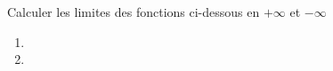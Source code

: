 \begin{exercice}
Calculer les limites des fonctions ci-dessous en $+\infty$ et $-\infty$
  \begin{enumerate}
  \item {}
  \item {}
  \end{enumerate}
 
\end{exercice}
